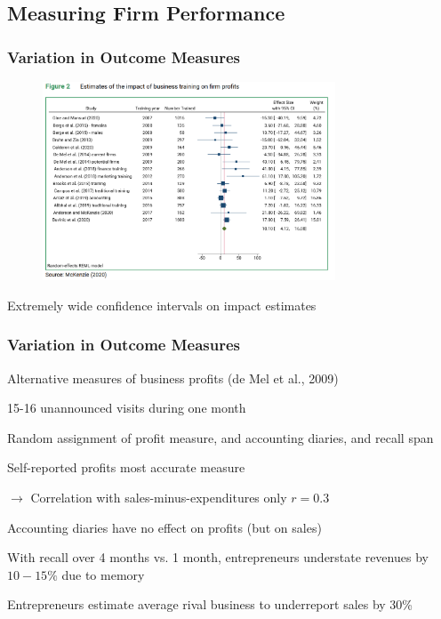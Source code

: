 \documentclass[hideothersubsections, usenames,dvipsnames,11pt]{beamer}
\newenvironment{itemize_2pt}{\itemize\addtolength{\itemsep}{2pt}}{\enditemize}
\newenvironment{enumerate_2pt}{\enumerate\addtolength{\itemsep}{2pt}}{\endenumerate}
\begin{document}
\subsection{Measuring Firm Performance}

\begin{frame}
\frametitle{Variation in Outcome Measures}
	
	\begin{figure}[htbp]
		\centering
		\includegraphics[width=23.5em]{pics/McK2020_profits.png}
		\label{McKenzie(2020): Profits2}
	\end{figure}	
	
\vspace{-1em}	
	
	\begin{itemize_2pt}
		\item \textcolor{bdf}{Extremely wide confidence intervals} on impact estimates
	\end{itemize_2pt}
\end{frame}


\begin{frame}
\frametitle{Variation in Outcome Measures}

Alternative measures of business profits \textcolor{camel}{(de Mel et al., 2009)}
	\begin{itemize_2pt}
		\item 15-16 unannounced visits during one month
		\item Random assignment of profit measure, and accounting diaries, and recall span
	\end{itemize_2pt}
		
	\pause	
		
	\vspace{0.5em}
		
	\begin{enumerate_2pt}
		\item \textcolor{bdf}{Self-reported profits most accurate measure}
		\item[] $\rightarrow$ Correlation with sales-minus-expenditures only $r=0.3$
		\item \textcolor{bdf}{Accounting diaries have no effect on profits} (but on sales)
		\item With recall over 4 months vs. 1 month, entrepreneurs \textcolor{bdf}{understate revenues by $10 - 15 \%$ due to memory} 
		\item Entrepreneurs estimate average rival business to \textcolor{bdf}{underreport sales by 30\%}
	\end{enumerate_2pt}	

\end{frame}
\end{document}

